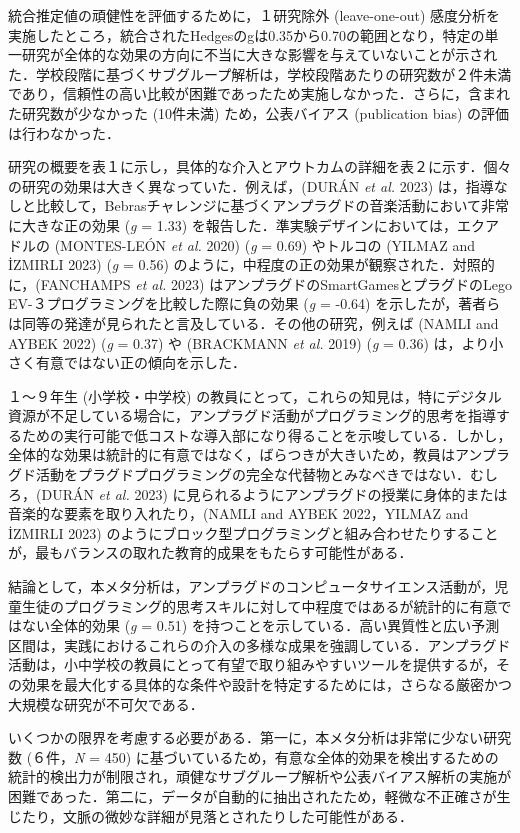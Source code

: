 \documentclass[
  lualatex, ja=standard, paper={182mm,257mm}, twocolumn, fontsize=8.5pt, baselineskip=13.5pt,
  line_length=24zw, column_gap=6.1mm, number_of_lines=45, head_space=24.5mm, gutter=16.25mm
]{jlreq}
\newcommand{\chap}[2]{\par\vspace{13.5pt}\needspace{4\baselineskip}{\centering\gtfamily\bfseries #1．#2\par}\nopagebreak}
\begin{document}
統合推定値の頑健性を評価するために，１研究除外 (leave-one-out) 感度分析を実施したところ，統合されたHedgesのgは0.35から0.70の範囲となり，特定の単一研究が全体的な効果の方向に不当に大きな影響を与えていないことが示された．学校段階に基づくサブグループ解析は，学校段階あたりの研究数が２件未満であり，信頼性の高い比較が困難であったため実施しなかった．さらに，含まれた研究数が少なかった (10件未満) ため，公表バイアス (publication bias) の評価は行わなかった．

研究の概要を表１に示し，具体的な介入とアウトカムの詳細を表２に示す．個々の研究の効果は大きく異なっていた．例えば，(DURÁN \textit{et al.} 2023) は，指導なしと比較して，Bebrasチャレンジに基づくアンプラグドの音楽活動において非常に大きな正の効果 (\textit{g} = 1.33) を報告した．準実験デザインにおいては，エクアドルの (MONTES-LEÓN \textit{et al.} 2020) (\textit{g} = 0.69) やトルコの (YILMAZ and İZMIRLI 2023) (\textit{g} = 0.56) のように，中程度の正の効果が観察された．対照的に，(FANCHAMPS \textit{et al.} 2023) はアンプラグドのSmartGamesとプラグドのLego EV-３プログラミングを比較した際に負の効果 (\textit{g} = -0.64) を示したが，著者らは同等の発達が見られたと言及している．その他の研究，例えば (NAMLI and AYBEK 2022) (\textit{g} = 0.37) や (BRACKMANN \textit{et al.} 2019) (\textit{g} = 0.36) は，より小さく有意ではない正の傾向を示した．

１〜９年生 (小学校・中学校) の教員にとって，これらの知見は，特にデジタル資源が不足している場合に，アンプラグド活動がプログラミング的思考を指導するための実行可能で低コストな導入部になり得ることを示唆している．しかし，全体的な効果は統計的に有意ではなく，ばらつきが大きいため，教員はアンプラグド活動をプラグドプログラミングの完全な代替物とみなべきではない．むしろ，(DURÁN \textit{et al.} 2023) に見られるようにアンプラグドの授業に身体的または音楽的な要素を取り入れたり，(NAMLI and AYBEK 2022，YILMAZ and İZMIRLI 2023) のようにブロック型プログラミングと組み合わせたりすることが，最もバランスの取れた教育的成果をもたらす可能性がある．

\chap{5}{まとめ}
結論として，本メタ分析は，アンプラグドのコンピュータサイエンス活動が，児童生徒のプログラミング的思考スキルに対して中程度ではあるが統計的に有意ではない全体的効果 (\textit{g} = 0.51) を持つことを示している．高い異質性と広い予測区間は，実践におけるこれらの介入の多様な成果を強調している．アンプラグド活動は，小中学校の教員にとって有望で取り組みやすいツールを提供するが，その効果を最大化する具体的な条件や設計を特定するためには，さらなる厳密かつ大規模な研究が不可欠である．

いくつかの限界を考慮する必要がある．第一に，本メタ分析は非常に少ない研究数 (６件，\textit{N} = 450) に基づいているため，有意な全体的効果を検出するための統計的検出力が制限され，頑健なサブグループ解析や公表バイアス解析の実施が困難であった．第二に，データが自動的に抽出されたため，軽微な不正確さが生じたり，文脈の微妙な詳細が見落とされたりした可能性がある．
\end{document}
